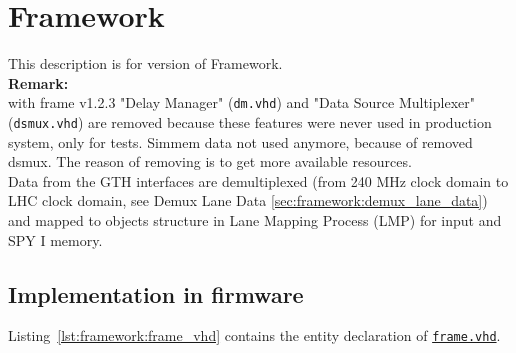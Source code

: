 \section{Framework}\label{sec:framework:framework}

This description is for version \versionframe of Framework.\\

\textbf{Remark:}\\
with frame v1.2.3 "Delay Manager" (\texttt{\textquotesingle dm.vhd\textquotesingle }) and "Data Source Multiplexer" (\texttt{\textquotesingle dsmux.vhd\textquotesingle }) are removed because these features were never used in production system, only for tests.
Simmem data not used anymore, because of removed dsmux.
The reason of removing is to get more available resources.\\

Data from the GTH interfaces are demultiplexed (from 240 MHz clock domain to LHC clock domain, see Demux Lane Data \ref{sec:framework:demux_lane_data}) and mapped to objects structure in Lane Mapping Process (LMP) for \ugtl input and SPY I memory.

\subsection{Implementation in firmware}
\label{sec:framework:implementation_firmware}

Listing~\ref{lst:framework:frame_vhd} contains the entity declaration of \href{\gitbranch/firmware/hdl/payload/frame.vhd}{\texttt{\textquotesingle frame.vhd\textquotesingle }}.\\



\clearpage

